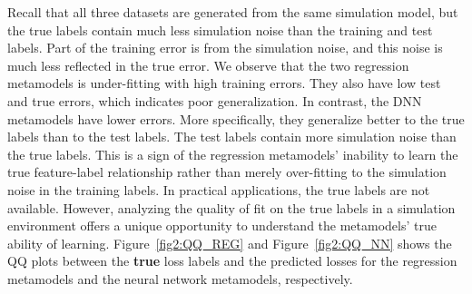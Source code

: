 Recall that all three datasets are generated from the same simulation model, but the true labels contain much less simulation noise than the training and test labels.
Part of the training error is from the simulation noise, and this noise is much less reflected in the true error.
We observe that the two regression metamodels is under-fitting with high training errors. 
They also have low test and true errors, which indicates poor generalization.
In contrast, the DNN metamodels have lower errors.
More specifically, they generalize better to the true labels than to the test labels.
The test labels contain more simulation noise than the true labels.
This is a sign of the regression metamodels' inability to learn the true feature-label relationship rather than merely over-fitting to the simulation noise in the training labels.
In practical applications, the true labels are not available.
However, analyzing the quality of fit on the true labels in a simulation environment offers a unique opportunity to understand the metamodels' true ability of learning.
Figure~\ref{fig2:QQ_REG} and Figure~\ref{fig2:QQ_NN} shows the QQ plots between the \textbf{true} loss labels and the predicted losses for the regression metamodels and the neural network metamodels, respectively.

